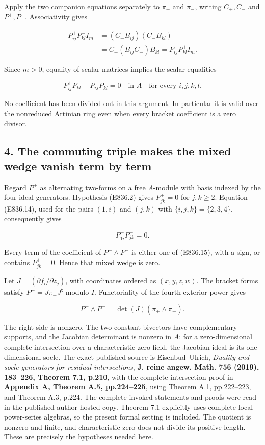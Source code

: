 Apply the two companion equations separately to \(\pi_+\) and \(\pi_-\),
writing \(C_+,C_-\) and \(P^+,P^-\). Associativity gives

\[
 \begin{aligned}
 P^+_{ij}P^-_{kl}I_m
   &=(C_+B_{ij})(C_-B_{kl})\\
   &=C_+(B_{ij}C_-)B_{kl}
     =P^-_{ij}P^+_{kl}I_m.
 \end{aligned}
 \tag{E836.13}
\]

Since \(m>0\), equality of scalar matrices implies the scalar equalities

\[
 P^+_{ij}P^-_{kl}-P^-_{ij}P^+_{kl}=0
          \quad\text{in }A
          \quad\text{for every }i,j,k,l.
 \tag{E836.14}
\]

No coefficient has been divided out in this argument. In particular it
is valid over the nonreduced Artinian ring even when every bracket
coefficient is a zero divisor.

\subsection{4. The commuting triple makes the mixed wedge vanish term by
term}\label{the-commuting-triple-makes-the-mixed-wedge-vanish-term-by-term}

Regard \(P^\pm\) as alternating two-forms on a free \(A\)-module with
basis indexed by the four ideal generators. Hypothesis (E836.2) gives
\(P^+_{jk}=0\) for \(j,k\ge2\). Equation (E836.14), used for the pairs
\((1,i)\) and \((j,k)\) with \(\{i,j,k\}=\{2,3,4\}\), consequently gives

\[
 P^+_{1i}P^-_{jk}=0.
 \tag{E836.15}
\]

Every term of the coefficient of \(P^+\wedge P^-\) is either one of
(E836.15), with a sign, or contains \(P^+_{jk}=0\). Hence that mixed
wedge is zero.

Let \(J=(\partial f_i/\partial z_j)\), with coordinates ordered as
\((x,y,z,w)\). The bracket forms satisfy
\(P^\pm=J\pi_\pm J^{\mathsf t}\) modulo \(I\). Functoriality of the
fourth exterior power gives

\[
 P^+\wedge P^-
    =\det(J)(\pi_+\wedge\pi_-).
 \tag{E836.16}
\]

The right side is nonzero. The two constant bivectors have complementary
supports, and the Jacobian determinant is nonzero in \(A\): for a
zero-dimensional complete intersection over a characteristic-zero field,
the Jacobian ideal is its one-dimensional socle. The exact published
source is Eisenbud--Ulrich, \emph{Duality and socle generators for
residual intersections}, \textbf{J. reine angew. Math. 756 (2019),
183--226, Theorem 7.1, p.210}, with the complete-intersection proof in
\textbf{Appendix A, Theorem A.5, pp.224--225}, using Theorem A.1,
pp.222--223, and Theorem A.3, p.224. The complete invoked statements and
proofs were read in the published author-hosted copy. Theorem 7.1
explicitly uses complete local power-series algebras, so the present
formal setting is included. The quotient is nonzero and finite, and
characteristic zero does not divide its positive length. These are
precisely the hypotheses needed here.

